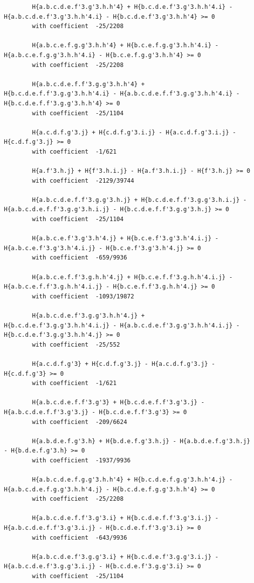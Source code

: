 \documentclass[11pt, a4paper]{kybernetika}
\begin{document}
\begin{verbatim}
		H{a.b.c.d.e.f'3.g'3.h.h'4} + H{b.c.d.e.f'3.g'3.h.h'4.i} - H{a.b.c.d.e.f'3.g'3.h.h'4.i} - H{b.c.d.e.f'3.g'3.h.h'4} >= 0
		with coefficient  -25/2208
		
		H{a.b.c.e.f.g.g'3.h.h'4} + H{b.c.e.f.g.g'3.h.h'4.i} - H{a.b.c.e.f.g.g'3.h.h'4.i} - H{b.c.e.f.g.g'3.h.h'4} >= 0
		with coefficient  -25/2208
		
		H{a.b.c.d.e.f.f'3.g.g'3.h.h'4} + H{b.c.d.e.f.f'3.g.g'3.h.h'4.i} - H{a.b.c.d.e.f.f'3.g.g'3.h.h'4.i} - H{b.c.d.e.f.f'3.g.g'3.h.h'4} >= 0
		with coefficient  -25/1104
		
		H{a.c.d.f.g'3.j} + H{c.d.f.g'3.i.j} - H{a.c.d.f.g'3.i.j} - H{c.d.f.g'3.j} >= 0
		with coefficient  -1/621
		
		H{a.f'3.h.j} + H{f'3.h.i.j} - H{a.f'3.h.i.j} - H{f'3.h.j} >= 0
		with coefficient  -2129/39744
		
		H{a.b.c.d.e.f.f'3.g.g'3.h.j} + H{b.c.d.e.f.f'3.g.g'3.h.i.j} - H{a.b.c.d.e.f.f'3.g.g'3.h.i.j} - H{b.c.d.e.f.f'3.g.g'3.h.j} >= 0
		with coefficient  -25/1104
		
		H{a.b.c.e.f'3.g'3.h'4.j} + H{b.c.e.f'3.g'3.h'4.i.j} - H{a.b.c.e.f'3.g'3.h'4.i.j} - H{b.c.e.f'3.g'3.h'4.j} >= 0
		with coefficient  -659/9936
		
		H{a.b.c.e.f.f'3.g.h.h'4.j} + H{b.c.e.f.f'3.g.h.h'4.i.j} - H{a.b.c.e.f.f'3.g.h.h'4.i.j} - H{b.c.e.f.f'3.g.h.h'4.j} >= 0
		with coefficient  -1093/19872
		
		H{a.b.c.d.e.f'3.g.g'3.h.h'4.j} + H{b.c.d.e.f'3.g.g'3.h.h'4.i.j} - H{a.b.c.d.e.f'3.g.g'3.h.h'4.i.j} - H{b.c.d.e.f'3.g.g'3.h.h'4.j} >= 0
		with coefficient  -25/552
		
		H{a.c.d.f.g'3} + H{c.d.f.g'3.j} - H{a.c.d.f.g'3.j} - H{c.d.f.g'3} >= 0
		with coefficient  -1/621
		
		H{a.b.c.d.e.f.f'3.g'3} + H{b.c.d.e.f.f'3.g'3.j} - H{a.b.c.d.e.f.f'3.g'3.j} - H{b.c.d.e.f.f'3.g'3} >= 0
		with coefficient  -209/6624
		
		H{a.b.d.e.f.g'3.h} + H{b.d.e.f.g'3.h.j} - H{a.b.d.e.f.g'3.h.j} - H{b.d.e.f.g'3.h} >= 0
		with coefficient  -1937/9936
		
		H{a.b.c.d.e.f.g.g'3.h.h'4} + H{b.c.d.e.f.g.g'3.h.h'4.j} - H{a.b.c.d.e.f.g.g'3.h.h'4.j} - H{b.c.d.e.f.g.g'3.h.h'4} >= 0
		with coefficient  -25/2208
		
		H{a.b.c.d.e.f.f'3.g'3.i} + H{b.c.d.e.f.f'3.g'3.i.j} - H{a.b.c.d.e.f.f'3.g'3.i.j} - H{b.c.d.e.f.f'3.g'3.i} >= 0
		with coefficient  -643/9936
		
		H{a.b.c.d.e.f'3.g.g'3.i} + H{b.c.d.e.f'3.g.g'3.i.j} - H{a.b.c.d.e.f'3.g.g'3.i.j} - H{b.c.d.e.f'3.g.g'3.i} >= 0
		with coefficient  -25/1104
		

\end{verbatim}
\end{document}
